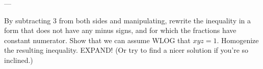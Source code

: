 ---


\begin{walk}
  \ii By subtracting $3$ from both sides and manipulating,
  rewrite the inequality in a form
  that does not have any minus signs,
  and for which the fractions have constant numerator.
  \ii Show that we can assume WLOG that $xyz = 1$.
  \ii Homogenize the resulting inequality.
  \ii EXPAND!  (Or try to find a nicer solution if you're so inclined.)
\end{walk}
